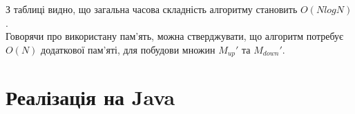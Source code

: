 \documentclass[a4paper,12pt,titlepage]{article}
\begin{document}
З таблиці видно, що загальна часова складність алгоритму становить $O(NlogN)$.\\

Говорячи про використану пам'ять, можна стверджувати, що алгоритм потребує $O(N)$ додаткової пам'яті, для побудови множин $M_{up}'$ та $M_{down}'$.

\newpage

\section{Реалізація на Java}


\end{document}
